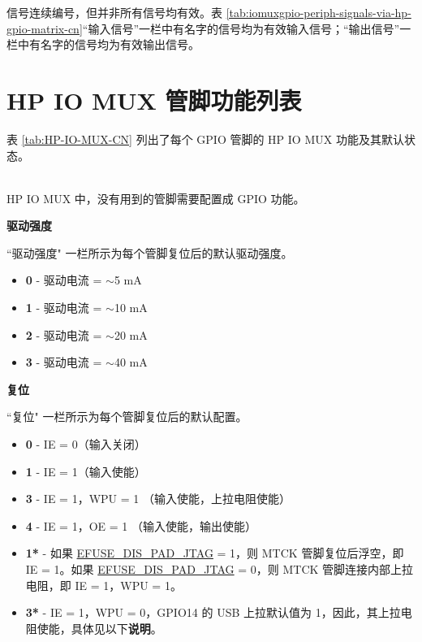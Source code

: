 \documentclass[main\_\_CN.tex]{subfiles}
\begin{document}
\begin{tiplisting}
信号连续编号，但并非所有信号均有效。表 \ref{tab:iomuxgpio-periph-signals-via-hp-gpio-matrix-cn}“输入信号”一栏中有名字的信号均为有效输入信号；“输出信号”一栏中有名字的信号均为有效输出信号。
\end{tiplisting}


\tableheaderHPSignalCN
\tablecontentHPSignal


\section{HP IO MUX 管脚功能列表}

表 \ref{tab:HP-IO-MUX-CN} 列出了每个 GPIO 管脚的 HP IO MUX 功能及其默认状态。

\tableheaderHPFunctionsCN
\tablecontentHPFunctions

\begin{importantlisting}\\
    HP IO MUX 中，没有用到的管脚需要配置成 GPIO 功能。
\end{importantlisting}

\normalsize

\textbf{驱动强度}

``驱动强度" 一栏所示为每个管脚复位后的默认驱动强度。

\begin{itemize}
\item \textbf{0} - 驱动电流 = $\sim$5 mA
\item \textbf{1} - 驱动电流 = $\sim$10 mA
\item \textbf{2} - 驱动电流 = $\sim$20 mA
\item \textbf{3} - 驱动电流 = $\sim$40 mA
\end{itemize}
\textbf{复位}

``复位" 一栏所示为每个管脚复位后的默认配置。

\begin{itemize}
\item \textbf{0} - IE = 0（输入关闭）
\item \textbf{1} - IE = 1（输入使能）
\item \textbf{3} - IE = 1，WPU = 1 （输入使能，上拉电阻使能）
\item \textbf{4} - IE = 1，OE = 1 （输入使能，输出使能）
\item \textbf{1*} - 如果 \hyperref[fielddesc:EFUSEDISPADJTAG]{EFUSE\_DIS\_PAD\_JTAG} = 1，则 MTCK 管脚复位后浮空，即 IE = 1。如果 \hyperref[fielddesc:EFUSEDISPADJTAG]{EFUSE\_DIS\_PAD\_JTAG} = 0，则 MTCK 管脚连接内部上拉电阻，即 IE = 1，WPU = 1。
\item \textbf{3*} - IE = 1，WPU = 0，GPIO14 的 USB 上拉默认值为 1，因此，其上拉电阻使能，具体见以下\textbf{说明}。
\end{itemize}
\end{document}
